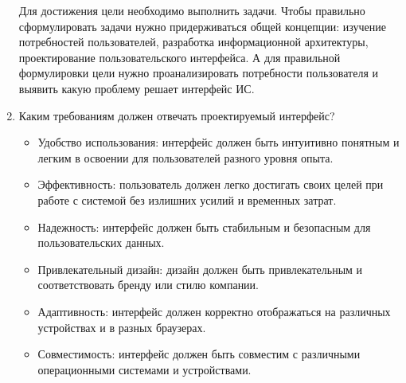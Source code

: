 \begin{enumerate}
        Для достижения цели необходимо выполнить задачи. Чтобы правильно сформулировать задачи нужно придерживаться общей концепции:
изучение потребностей пользователей, разработка информационной архитектуры, проектирование пользовательского интерфейса. А для правильной формулировки цели нужно проанализировать потребности пользователя и выявить какую проблему решает интерфейс ИС.
    \item Каким требованиям должен отвечать проектируемый интерфейс?
        \begin{itemize}
            \item Удобство использования: интерфейс должен быть интуитивно понятным и легким в освоении для пользователей разного уровня опыта.
            \item Эффективность: пользователь должен легко достигать своих целей при работе с системой без излишних усилий и временных затрат.
            \item Надежность: интерфейс должен быть стабильным и безопасным для пользовательских данных.
            \item Привлекательный дизайн: дизайн должен быть привлекательным и соответствовать бренду или стилю компании.
            \item Адаптивность: интерфейс должен корректно отображаться на различных устройствах и в разных браузерах.
            \item Совместимость: интерфейс должен быть совместим с различными операционными системами и устройствами.
        \end{itemize}
\end{enumerate}


